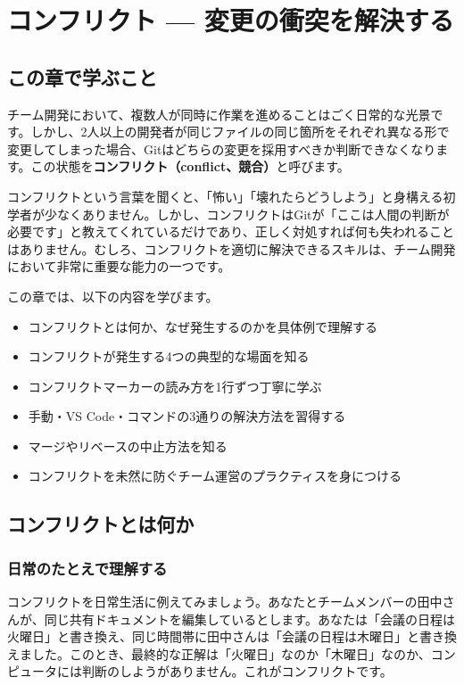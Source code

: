 \chapter{コンフリクト — 変更の衝突を解決する}

\section{この章で学ぶこと}

チーム開発において、複数人が同時に作業を進めることはごく日常的な光景です。しかし、2人以上の開発者が同じファイルの同じ箇所をそれぞれ異なる形で変更してしまった場合、Gitはどちらの変更を採用すべきか判断できなくなります。この状態を\textbf{コンフリクト（conflict、競合）}と呼びます。

コンフリクトという言葉を聞くと、「怖い」「壊れたらどうしよう」と身構える初学者が少なくありません。しかし、コンフリクトはGitが「ここは人間の判断が必要です」と教えてくれているだけであり、正しく対処すれば何も失われることはありません。むしろ、コンフリクトを適切に解決できるスキルは、チーム開発において非常に重要な能力の一つです。

この章では、以下の内容を学びます。

\begin{itemize}
  \item コンフリクトとは何か、なぜ発生するのかを具体例で理解する
  \item コンフリクトが発生する4つの典型的な場面を知る
  \item コンフリクトマーカーの読み方を1行ずつ丁寧に学ぶ
  \item 手動・VS Code・コマンドの3通りの解決方法を習得する
  \item マージやリベースの中止方法を知る
  \item コンフリクトを未然に防ぐチーム運営のプラクティスを身につける
\end{itemize}

\section{コンフリクトとは何か}

\subsection{日常のたとえで理解する}

コンフリクトを日常生活に例えてみましょう。あなたとチームメンバーの田中さんが、同じ共有ドキュメントを編集しているとします。あなたは「会議の日程は火曜日」と書き換え、同じ時間帯に田中さんは「会議の日程は木曜日」と書き換えました。このとき、最終的な正解は「火曜日」なのか「木曜日」なのか、コンピュータには判断のしようがありません。これがコンフリクトです。

